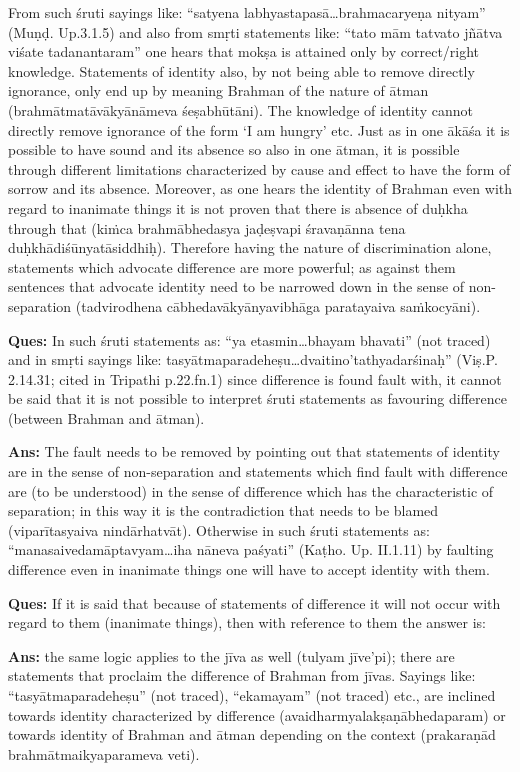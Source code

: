 From such śruti sayings like: “satyena labhyastapasā…brahmacaryeṇa nityam” (Muṇḍ. Up.3.1.5) and also from smṛti statements like: “tato mām tatvato jñātva viśate tadanantaram” one hears that mokṣa is attained only by correct/right knowledge. Statements of identity also, by not being able to remove directly ignorance, only end up by meaning Brahman of the nature of ātman (brahmātmatāvākyānāmeva śeṣabhūtāni). The knowledge of identity cannot directly remove ignorance of the form ‘I am hungry’ etc. Just as in one ākāśa it is possible to have sound and its absence so also in one ātman, it is possible through different limitations characterized by cause and effect to have the form of sorrow and its absence. Moreover, as one hears the identity of Brahman even with regard to inanimate things it is not proven that there is absence of duḥkha through that (kiṁca brahmābhedasya jaḍeṣvapi śravaṇānna tena duḥkhādiśūnyatāsiddhiḥ). Therefore  having the nature of discrimination alone, statements which advocate difference are more powerful; as against them sentences that advocate identity need to be narrowed down in the sense of non-separation (tadvirodhena cābhedavākyānyavibhāga paratayaiva saṁkocyāni).

\textbf{Ques:} In such śruti statements as:  “ya etasmin…bhayam bhavati” (not traced) and in smṛti sayings like: tasyātmaparadeheṣu…dvaitino’ta\-thyadarśinaḥ” (Viṣ.P. 2.14.31; cited in Tripathi p.22.fn.1) since difference is found fault with, it cannot be said that it is not possible to interpret śruti statements as favouring difference (between Brahman and ātman).

\textbf{Ans:} The fault needs to be removed by pointing out that statements of identity are in the sense of non-separation and statements  which find fault with difference are (to be understood) in the sense of difference which has the characteristic  of separation; in this way it is the contradiction that needs to be blamed (viparītasyaiva nindārhatvāt). Otherwise in such śruti statements as: “manasaivedamāptavyam…iha nāneva paśyati” (Kaṭho. Up. II.1.11) by faulting difference even in inanimate things one will have to accept identity with them. 

\textbf{Ques:} If it is said that because of statements of difference it will not occur with regard to them (inanimate things), then with reference to them the answer is:

\textbf{Ans:} the same logic applies to the jīva as well (tulyam jīve’pi); there are statements that proclaim the difference of Brahman from jīvas. Sayings like: “tasyātmaparadeheṣu” (not traced), “ekamayam” (not traced) etc., are inclined towards identity characterized by difference (avaidharmyalakṣaṇābhedaparam) or towards identity of Brahman and ātman depending on the context (prakaraṇād brahmātmaikyaparameva veti).

